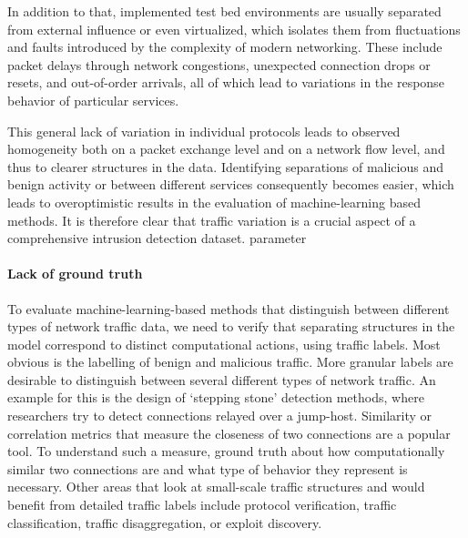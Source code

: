 In addition to that, implemented test bed environments are usually separated from external influence or even virtualized, which isolates them from fluctuations and faults introduced by the complexity of modern networking. These include packet delays through network congestions, unexpected connection drops or resets, and out-of-order arrivals, all of which lead to variations in the response behavior of particular services.

This general lack of variation in individual protocols leads to observed homogeneity both on a packet exchange level and on a network flow level, and thus to clearer structures in the data. Identifying separations of malicious and benign activity or between different services consequently becomes easier, which leads to overoptimistic results in the evaluation of machine-learning based methods. It is therefore clear that traffic variation is a crucial aspect of a comprehensive intrusion detection dataset.
parameter

\paragraph{Lack of ground truth}

To evaluate machine-learning-based methods that distinguish between different types of network traffic data, we need to verify that separating structures in the model correspond to distinct computational actions, using traffic labels. Most obvious is the labelling of benign and malicious traffic. More granular labels are desirable to distinguish between several different types of network traffic. An example for this is the design of `stepping stone' detection methods, where researchers try to detect connections relayed over a jump-host. Similarity or correlation metrics that measure the closeness of two connections are a popular tool. To understand such a measure, ground truth about how computationally similar two connections are and what type of behavior they represent is necessary. 
Other areas that look at small-scale traffic structures and would benefit from detailed traffic labels include protocol verification, traffic classification, traffic disaggregation, or exploit discovery.

